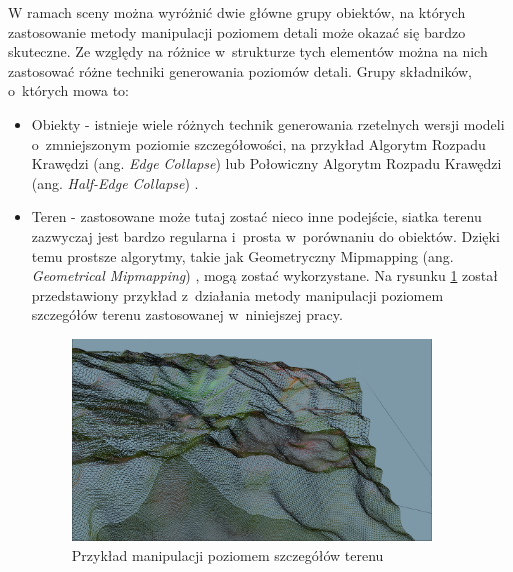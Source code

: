 \documentclass[a4paper,twoside,12pt]{book}
\newcommand{\obcy}[1]{\emph{#1}}
\newcommand{\ang}[1]{{\selectlanguage{british}\obcy{#1}}}
\begin{document}
W ramach sceny można wyróżnić dwie główne grupy obiektów, na których zastosowanie metody manipulacji poziomem detali może okazać się bardzo skuteczne. Ze względy na różnice w~strukturze tych elementów można na nich zastosować różne techniki generowania poziomów detali. Grupy składników, o~których mowa to:
\begin{itemize}
    \item Obiekty - istnieje wiele różnych technik generowania rzetelnych wersji modeli o~zmniejszonym poziomie szczegółowości, na przykład Algorytm Rozpadu Krawędzi (ang. \ang{Edge Collapse}) \cite{lod2} \cite{lod} lub Połowiczny Algorytm Rozpadu Krawędzi (ang. \ang{Half-Edge Collapse}) \cite{lod1}.
    \item Teren - zastosowane może tutaj zostać nieco inne podejście, siatka terenu zazwyczaj jest bardzo regularna i~prosta w~porównaniu do obiektów. Dzięki temu prostsze algorytmy, takie jak Geometryczny Mipmapping (ang. \ang{Geometrical Mipmapping}) \cite{lod3}, mogą zostać wykorzystane. Na rysunku \ref{fig:lod_terrain_example} został przedstawiony przykład z~działania metody manipulacji poziomem szczegółów terenu zastosowanej w~niniejszej pracy.
    \begin{figure}[H]
        \centering
        \includegraphics[width=0.9\textwidth]{res/lod_terrain_example.png}
        \caption{Przykład manipulacji poziomem szczegółów terenu}
        \label{fig:lod_terrain_example}
    \end{figure}
\end{itemize}
\end{document}
